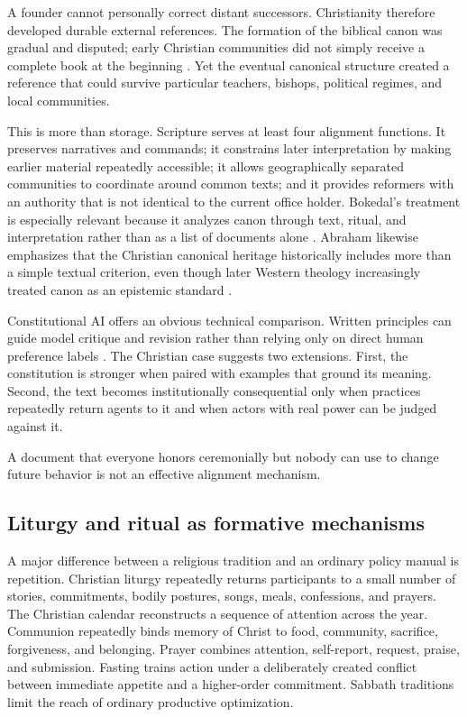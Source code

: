\documentclass[11pt]{article}
\begin{document}
A founder cannot personally correct distant successors. Christianity therefore developed durable external references. The formation of the biblical canon was gradual and disputed; early Christian communities did not simply receive a complete book at the beginning \parencite{gallagher2017canon,bokedal2014canon}. Yet the eventual canonical structure created a reference that could survive particular teachers, bishops, political regimes, and local communities.

This is more than storage. Scripture serves at least four alignment functions. It preserves narratives and commands; it constrains later interpretation by making earlier material repeatedly accessible; it allows geographically separated communities to coordinate around common texts; and it provides reformers with an authority that is not identical to the current office holder. Bokedal's treatment is especially relevant because it analyzes canon through text, ritual, and interpretation rather than as a list of documents alone \parencite{bokedal2014canon}. Abraham likewise emphasizes that the Christian canonical heritage historically includes more than a simple textual criterion, even though later Western theology increasingly treated canon as an epistemic standard \parencite{abraham2002canon}.

Constitutional AI offers an obvious technical comparison. Written principles can guide model critique and revision rather than relying only on direct human preference labels \parencite{bai2022constitutional}. The Christian case suggests two extensions. First, the constitution is stronger when paired with examples that ground its meaning. Second, the text becomes institutionally consequential only when practices repeatedly return agents to it and when actors with real power can be judged against it.

A document that everyone honors ceremonially but nobody can use to change future behavior is not an effective alignment mechanism.

\subsection{Liturgy and ritual as formative mechanisms}

A major difference between a religious tradition and an ordinary policy manual is repetition. Christian liturgy repeatedly returns participants to a small number of stories, commitments, bodily postures, songs, meals, confessions, and prayers. The Christian calendar reconstructs a sequence of attention across the year. Communion repeatedly binds memory of Christ to food, community, sacrifice, forgiveness, and belonging. Prayer combines attention, self-report, request, praise, and submission. Fasting trains action under a deliberately created conflict between immediate appetite and a higher-order commitment. Sabbath traditions limit the reach of ordinary productive optimization.
\end{document}
